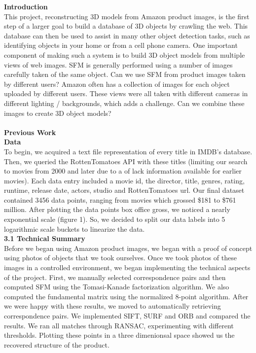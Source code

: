 \documentclass[12pt]{article}
\begin{document}
\begin{multicols}{2}
{\noindent \large \textbf{Introduction}}\\
This project, reconstructing 3D models from Amazon product images, is the first step of a larger goal to build a database of 3D objects by crawling the web.  This database can then be used to assist in many other object detection tasks, such as identifying objects in your home or from a cell phone camera.  One important component of making such a system is to build 3D object models from multiple views of web images. SFM is generally performed using a number of images carefully taken of the same object.  Can we use SFM from product images taken by different users?  Amazon often has a collection of images for each object uploaded by different users.  These views were all taken with different cameras in different lighting / backgrounds, which adds a challenge.  Can we combine these images to create 3D object models?
\\\\
{\large \textbf{Previous Work}}\\

{\large \textbf{Data}}\\
To begin, we acquired a text file representation of every title in IMDB’s database. Then, we queried the RottenTomatoes API with these titles (limiting our search to movies from 2000 and later due to a of lack information available for earlier movies). Each data entry included a movie id, the director, title, genres, rating, runtime, release date, actors, studio and RottenTomatoes url. Our final dataset contained 3456 data points, ranging from movies which grossed \$181 to \$761 million. After plotting the data points box office gross, we noticed a nearly exponential scale (figure 1). So, we decided to split our data labels into 5 logarithmic scale buckets to linearize the data.\\
{\large \textbf{3.1 Technical Summary}}\\
Before we began using Amazon product images, we began with a proof of concept using photos of objects that we took ourselves. Once we took photos of these images in a controlled environment, we began implementing the technical aspects of the project. First, we manually selected correspondence pairs and then computed SFM using the Tomasi-Kanade factorization algorithm. We also computed the fundamental matrix using the normalized 8-point algorithm. After we were happy with these results, we moved to automatically retrieving correspondence pairs. We implemented SIFT, SURF and ORB and compared the results. We ran all matches through RANSAC, experimenting with different thresholds. Plotting these points in a three dimenionsal space showed us the recovered structure of the product. 


\end{multicols}
\end{document}
